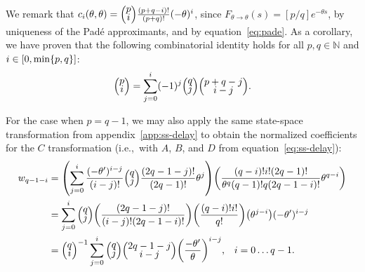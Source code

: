 \documentclass[12pt]{article}
\theoremstyle{definition}
\let\originalleft\left
\let\originalright\right
\renewcommand{\left}{\mathopen{}\mathclose\bgroup\originalleft}
\renewcommand{\right}{\aftergroup\egroup\originalright}
\newenvironment{hpmatrix}{\begingroup\def\arraystretch{0.5}\begin{pmatrix}}{\end{pmatrix}\endgroup\ignorespacesafterend}
\begin{document}
We remark that $c_i(\theta, \theta) = \begin{hpmatrix}p \\ i\end{hpmatrix} \frac{(p + q - i)!}{(p + q)!} (-\theta)^i$, since $F_{\theta \rightarrow \theta}(s) = [p/q] e^{-\theta s}$, by uniqueness of the Pad\'e approximants, and by equation~\ref{eq:pade}.
As a corollary, we have proven that the following combinatorial identity holds for all $p, q \in \mathbb{N}$ and $i \in \left[ 0, \min\{p, q\} \right]$:
\begin{align*}
\begin{hpmatrix}p \\ i\end{hpmatrix} = \sum_{j=0}^i (-1)^j \begin{hpmatrix}q \\ j\end{hpmatrix} \begin{hpmatrix}p + q - j \\ i - j\end{hpmatrix} \text{.}
\end{align*}

For the case when $p = q - 1$, we may also apply the same state-space transformation from appendix~\ref{app:ss-delay} to obtain the normalized coefficients for the $C$ transformation (i.e.,~with $A$, $B$, and $D$ from equation~\ref{eq:ss-delay}):
\begin{align*}
w_{q-1-i} &= \left( \sum_{j=0}^i \frac{(-\theta')^{i-j}}{(i - j)!} \begin{hpmatrix}q \\ j\end{hpmatrix} \frac{(2q - 1 - j)!}{(2q - 1)!} \theta^j \right) \left( \frac{(q - i)! i! (2q - 1)!}{\theta^q (q - 1)! q(2q - 1 - i)!} \theta^{q - i} \right) \\
&= \sum_{j=0}^i \begin{hpmatrix}q \\ j\end{hpmatrix} \left( \frac{(2q - 1 - j)!}{(i - j)! (2q - 1 - i)!} \right) \left( \frac{(q - i)! i!}{q!} \right) \left( \theta^{j - i} \right) (-\theta')^{i - j} \\
&= \begin{hpmatrix}q \\ i\end{hpmatrix}^{-1} \sum_{j=0}^i \begin{hpmatrix}q \\ j\end{hpmatrix} \begin{hpmatrix}2q - 1 - j \\ i - j\end{hpmatrix} \left( \frac{-\theta'}{\theta} \right)^{i - j} \text{,} \quad i = 0 \ldots q - 1 \text{.}
\end{align*}
\end{document}
